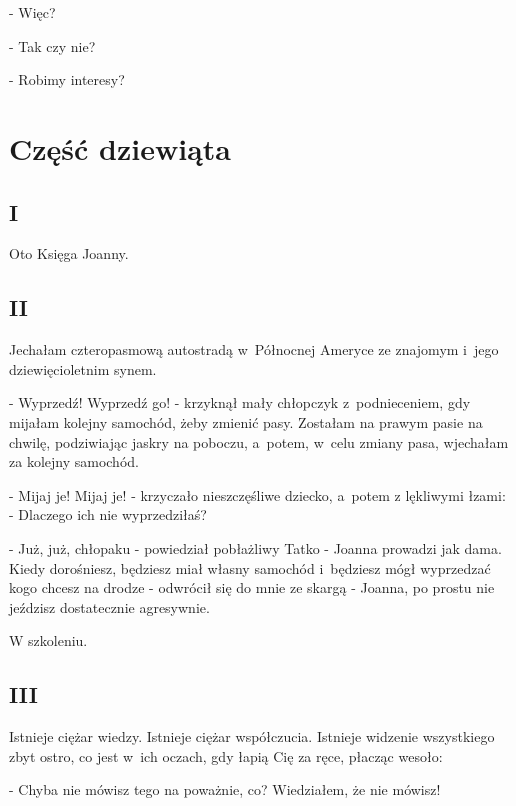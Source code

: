 \documentclass[oneside,polish,12pt,sfheadings]{mwbk}
\begin{document}
- Więc?

- Tak czy nie?

- Robimy interesy?

\part*{Część dziewiąta}

\chapter{I}

Oto Księga Joanny.

\chapter{II}

Jechałam czteropasmową autostradą w~Północnej Ameryce ze znajomym
i~jego dziewięcioletnim synem.

- Wyprzedź! Wyprzedź go! - krzyknął mały chłopczyk z~podnieceniem,
gdy mijałam kolejny samochód, żeby zmienić pasy. Zostałam na prawym
pasie na chwilę, podziwiając jaskry na poboczu, a~potem, w~celu zmiany
pasa, wjechałam za kolejny samochód.

- Mijaj je! Mijaj je! - krzyczało nieszczęśliwe dziecko, a~potem z
lękliwymi łzami: - Dlaczego ich nie wyprzedziłaś?

- Już, już, chłopaku - powiedział pobłażliwy Tatko - Joanna prowadzi
jak dama. Kiedy dorośniesz, będziesz miał własny samochód i~będziesz mógł wyprzedzać
kogo chcesz na drodze - odwrócił się do mnie ze skargą - Joanna, po
prostu nie jeździsz dostatecznie agresywnie.

W szkoleniu.

\chapter{III}

Istnieje ciężar wiedzy. Istnieje ciężar współczucia. Istnieje widzenie
wszystkiego zbyt ostro, co jest w~ich oczach, gdy łapią Cię za ręce,
płacząc wesoło: 

- Chyba nie mówisz tego na poważnie, co? Wiedziałem,
że nie mówisz!
\end{document}
